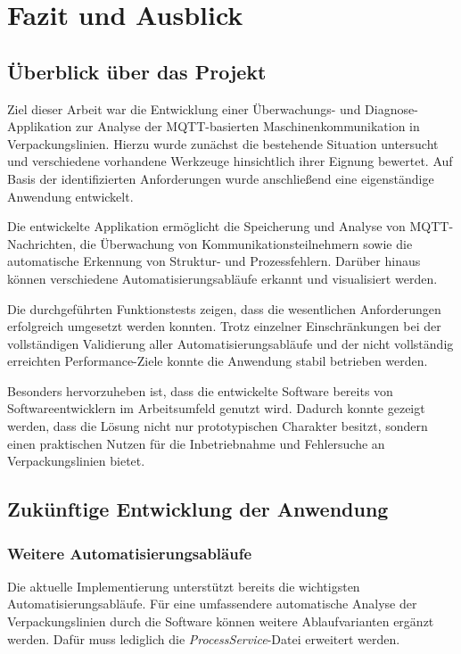 \chapter{Fazit und Ausblick}
\label{cha:Fazit und Ausblick}

\section{Überblick über das Projekt}
Ziel dieser Arbeit war die Entwicklung einer Überwachungs- und Diagnose-Applikation zur Analyse der MQTT-basierten Maschinenkommunikation in Verpackungslinien. Hierzu wurde zunächst die bestehende Situation untersucht und verschiedene vorhandene Werkzeuge hinsichtlich ihrer Eignung bewertet. Auf Basis der identifizierten Anforderungen wurde anschließend eine eigenständige Anwendung entwickelt.

Die entwickelte Applikation ermöglicht die Speicherung und Analyse von MQTT-Nachrichten, die Überwachung von Kommunikationsteilnehmern sowie die automatische Erkennung von Struktur- und Prozessfehlern. Darüber hinaus können verschiedene Automatisierungsabläufe erkannt und visualisiert werden.

Die durchgeführten Funktionstests zeigen, dass die wesentlichen Anforderungen erfolgreich umgesetzt werden konnten. Trotz einzelner Einschränkungen bei der vollständigen Validierung aller Automatisierungsabläufe und der nicht vollständig erreichten Performance-Ziele konnte die Anwendung stabil betrieben werden.

Besonders hervorzuheben ist, dass die entwickelte Software bereits von Softwareentwicklern im Arbeitsumfeld genutzt wird. Dadurch konnte gezeigt werden, dass die Lösung nicht nur prototypischen Charakter besitzt, sondern einen praktischen Nutzen für die Inbetriebnahme und Fehlersuche an Verpackungslinien bietet.

\section{Zukünftige Entwicklung der Anwendung}
\subsection{Weitere Automatisierungsabläufe}
Die aktuelle Implementierung unterstützt bereits die wichtigsten Automatisierungsabläufe. Für eine umfassendere automatische Analyse der Verpackungslinien durch die Software können weitere Ablaufvarianten ergänzt werden. Dafür muss lediglich die \textit{ProcessService}-Datei erweitert werden.


